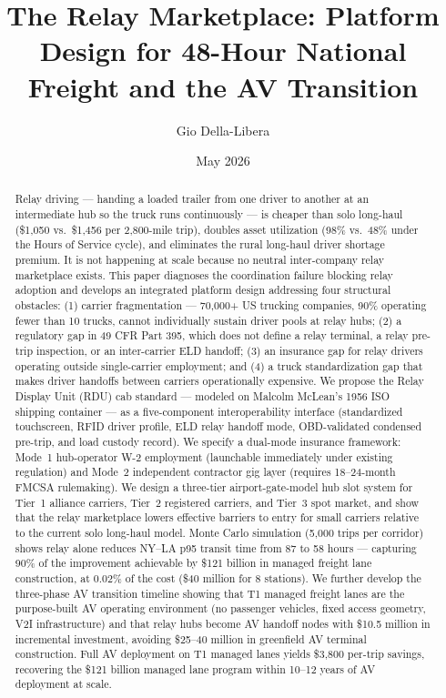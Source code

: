 \documentclass[12pt]{article}
\title{The Relay Marketplace: Platform Design for 48-Hour National Freight and the AV Transition}
\author{Gio Della-Libera}
\date{May 2026}
\begin{document}
\maketitle
\begin{abstract}
Relay driving --- handing a loaded trailer from one driver to another at an intermediate hub
so the truck runs continuously --- is cheaper than solo long-haul (\$1,050 vs.\ \$1,456 per
2,800-mile trip), doubles asset utilization (98\% vs.\ 48\% under the Hours of Service cycle),
and eliminates the rural long-haul driver shortage premium. It is not happening at scale because
no neutral inter-company relay marketplace exists. This paper diagnoses the coordination failure
blocking relay adoption and develops an integrated platform design addressing four structural
obstacles: (1) carrier fragmentation --- 70,000+ US trucking companies, 90\% operating fewer
than 10 trucks, cannot individually sustain driver pools at relay hubs; (2) a regulatory gap
in 49 CFR Part 395, which does not define a relay terminal, a relay pre-trip inspection, or
an inter-carrier ELD handoff; (3) an insurance gap for relay drivers operating outside
single-carrier employment; and (4) a truck standardization gap that makes driver handoffs
between carriers operationally expensive. We propose the Relay Display Unit (RDU) cab
standard --- modeled on Malcolm McLean's 1956 ISO shipping container --- as a five-component
interoperability interface (standardized touchscreen, RFID driver profile, ELD relay handoff
mode, OBD-validated condensed pre-trip, and load custody record). We specify a dual-mode
insurance framework: Mode~1 hub-operator W-2 employment (launchable immediately under
existing regulation) and Mode~2 independent contractor gig layer (requires 18--24-month FMCSA
rulemaking). We design a three-tier airport-gate-model hub slot system for Tier~1 alliance
carriers, Tier~2 registered carriers, and Tier~3 spot market, and show that the relay
marketplace lowers effective barriers to entry for small carriers relative to the current solo
long-haul model. Monte Carlo simulation (5,000 trips per corridor) shows relay alone reduces
NY--LA p95 transit time from 87 to 58 hours --- capturing 90\% of the improvement achievable
by \$121 billion in managed freight lane construction, at 0.02\% of the cost (\$40 million for
8 stations). We further develop the three-phase AV transition timeline showing that T1 managed
freight lanes are the purpose-built AV operating environment (no passenger vehicles, fixed
access geometry, V2I infrastructure) and that relay hubs become AV handoff nodes with
\$10.5 million in incremental investment, avoiding \$25--40 million in greenfield AV terminal
construction. Full AV deployment on T1 managed lanes yields \$3,800 per-trip savings,
recovering the \$121 billion managed lane program within 10--12 years of AV deployment at scale.
\end{abstract}










\end{document}
